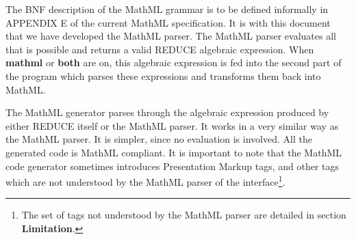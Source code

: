 \documentclass{article}
\begin{document}
The BNF description of the MathML grammar is to be defined informally in
APPENDIX E of the current MathML specification. It is with this document that
we have developed the MathML parser. The MathML parser evaluates all
that is possible and returns a valid REDUCE algebraic expression. When {\bf
mathml} or {\bf both} are on, this algebraic expression is fed into the
second part of the program which parses these expressions and transforms them
back into MathML. 

The MathML generator parses through the algebraic expression produced by
either REDUCE itself or the MathML parser. It works in a very
similar way as the MathML parser. It is simpler, since no evaluation is
involved. All the generated code is MathML compliant. It is important to note
that the MathML code generator sometimes introduces Presentation Markup tags,
and other tags which are not understood by the MathML parser of the
interface\footnote{The set of tags not understood by the MathML parser are
detailed in section {\bf Limitation}.}.
\end{document}
